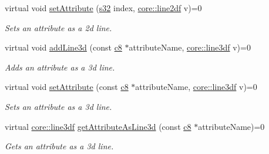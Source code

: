 \begin{DoxyCompactItemize}
\mbox{\label{classirr_1_1io_1_1IAttributes_a818870208df1c6dc37462451761efab1}} 
virtual void \hyperlink{classirr_1_1io_1_1IAttributes_a818870208df1c6dc37462451761efab1}{set\+Attribute} (\hyperlink{namespaceirr_ac66849b7a6ed16e30ebede579f9b47c6}{s32} index, \hyperlink{namespaceirr_1_1core_a19bbe2f8741053a37be916e9ea42e456}{core\+::line2df} v)=0
\begin{DoxyCompactList}\small\item\em Sets an attribute as a 2d line. \end{DoxyCompactList}\item 
\mbox{\label{classirr_1_1io_1_1IAttributes_abbfb8cb612936e2f9c4b6728deb4b0c9}} 
virtual void \hyperlink{classirr_1_1io_1_1IAttributes_abbfb8cb612936e2f9c4b6728deb4b0c9}{add\+Line3d} (const \hyperlink{namespaceirr_a9395eaea339bcb546b319e9c96bf7410}{c8} $\ast$attribute\+Name, \hyperlink{namespaceirr_1_1core_a384a3bb17659466af5521c7f74cfcea7}{core\+::line3df} v)=0
\begin{DoxyCompactList}\small\item\em Adds an attribute as a 3d line. \end{DoxyCompactList}\item 
\mbox{\label{classirr_1_1io_1_1IAttributes_a0f7d2a6c68c2faa0933189c3d6a55913}} 
virtual void \hyperlink{classirr_1_1io_1_1IAttributes_a0f7d2a6c68c2faa0933189c3d6a55913}{set\+Attribute} (const \hyperlink{namespaceirr_a9395eaea339bcb546b319e9c96bf7410}{c8} $\ast$attribute\+Name, \hyperlink{namespaceirr_1_1core_a384a3bb17659466af5521c7f74cfcea7}{core\+::line3df} v)=0
\begin{DoxyCompactList}\small\item\em Sets an attribute as a 3d line. \end{DoxyCompactList}\item 
virtual \hyperlink{namespaceirr_1_1core_a384a3bb17659466af5521c7f74cfcea7}{core\+::line3df} \hyperlink{classirr_1_1io_1_1IAttributes_ab6da415d43f2a4211026b191b17b0938}{get\+Attribute\+As\+Line3d} (const \hyperlink{namespaceirr_a9395eaea339bcb546b319e9c96bf7410}{c8} $\ast$attribute\+Name)=0
\begin{DoxyCompactList}\small\item\em Gets an attribute as a 3d line. \end{DoxyCompactList}\item 

\end{DoxyCompactItemize}
